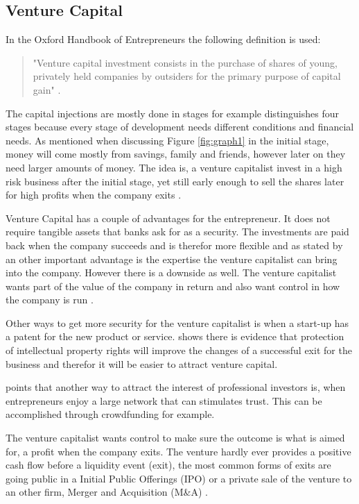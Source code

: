 \documentclass[a4paper, 11pt]{article}
\begin{document}
\subsection{Venture Capital}

In the Oxford Handbook of Entrepreneurs the following definition is used:

\begin{quote}
"Venture capital investment consists in the purchase of shares of young, privately held companies by outsiders for the primary purpose of capital gain" \citep[P.355]{casson2008oxford}.
\end{quote}

The capital injections are mostly done in stages \cite{TiddBessant} for example distinguishes four stages because every stage of development needs different conditions and financial needs. As mentioned when discussing Figure \ref{fig:graph1} in the initial stage, money will come mostly from savings, family and friends, however later on they need larger amounts of money. The idea is, a venture capitalist invest in a high risk business after the initial stage, yet still early enough to sell the shares later for high profits when the company exits \citep{TiddBessant}.

Venture Capital has a couple of advantages for the entrepreneur. It does not require tangible assets that banks ask for as a security. The investments are paid back when the company succeeds and is therefor more flexible and as stated by \cite{casson2008oxford} an other important advantage is the expertise the venture capitalist can bring into the company. However there is a downside as well. The venture capitalist wants part of the value of the company in return and also want control in how the company is run \citep{casson2008oxford}.

Other ways to get more security for the venture capitalist is when a start-up has a patent for the new product or service.
\cite{nadeau2011innovation} shows there is evidence that protection of intellectual property rights will improve the changes of a successful exit for the business and therefor it will be easier to attract venture capital.

 \cite{Roma} points that another way to attract the interest of professional investors is, when entrepreneurs enjoy a large network that can stimulates trust. This can be accomplished through crowdfunding for example.


The venture capitalist wants control to make sure the outcome is what is aimed for, a profit when the company exits. The venture hardly ever provides a positive cash flow before a liquidity event (exit), the most common forms of exits are going public in a Initial Public Offerings (IPO) or a private sale of the venture to an other firm, Merger and Acquisition (M\&A) \citep{nadeau2011innovation}.
\end{document}
